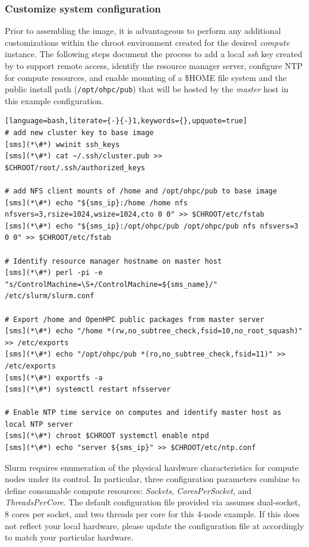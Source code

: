 \documentclass[letterpaper]{article}
\begin{document}
\subsubsection{Customize system configuration} \label{sec:master_customization}

Prior to assembling the image, it is advantageous to perform any additional
customizations within the chroot environment created for the desired {\em
 compute} instance. The following steps document the process to add a local
{\em ssh} key created by \Warewulf{} to support remote access, identify the
resource manager server, configure NTP for compute resources, and enable \NFS{}
mounting of a \$HOME file system and the public \OHPC{} install path
(\texttt{/opt/ohpc/pub}) that will be hosted by the {\em master} host in this
example configuration.

\begin{lstlisting}[language=bash,literate={-}{-}1,keywords={},upquote=true]
# add new cluster key to base image
[sms](*\#*) wwinit ssh_keys
[sms](*\#*) cat ~/.ssh/cluster.pub >> $CHROOT/root/.ssh/authorized_keys

# add NFS client mounts of /home and /opt/ohpc/pub to base image
[sms](*\#*) echo "${sms_ip}:/home /home nfs nfsvers=3,rsize=1024,wsize=1024,cto 0 0" >> $CHROOT/etc/fstab
[sms](*\#*) echo "${sms_ip}:/opt/ohpc/pub /opt/ohpc/pub nfs nfsvers=3 0 0" >> $CHROOT/etc/fstab

# Identify resource manager hostname on master host
[sms](*\#*) perl -pi -e "s/ControlMachine=\S+/ControlMachine=${sms_name}/" /etc/slurm/slurm.conf

# Export /home and OpenHPC public packages from master server
[sms](*\#*) echo "/home *(rw,no_subtree_check,fsid=10,no_root_squash)" >> /etc/exports
[sms](*\#*) echo "/opt/ohpc/pub *(ro,no_subtree_check,fsid=11)" >> /etc/exports
[sms](*\#*) exportfs -a
[sms](*\#*) systemctl restart nfsserver

# Enable NTP time service on computes and identify master host as local NTP server
[sms](*\#*) chroot $CHROOT systemctl enable ntpd
[sms](*\#*) echo "server ${sms_ip}" >> $CHROOT/etc/ntp.conf
\end{lstlisting}


\begin{center}
\begin{tcolorbox}[]
  \small Slurm requires enumeration of the physical hardware characteristics
  for compute nodes under its control. In particular, three configuration
  parameters combine to define consumable compute resources: {\em Sockets},
  {\em CoresPerSocket}, and {\em ThreadsPerCore}. The default configuration
  file provided via \OHPC{} assumes dual-socket, 8 cores per socket, and two
  threads per core for this 4-node example. If this does not reflect your local
  hardware, please update the configuration file at
   accordingly to match your particular hardware.
\end{tcolorbox}
\end{center}
\end{document}
